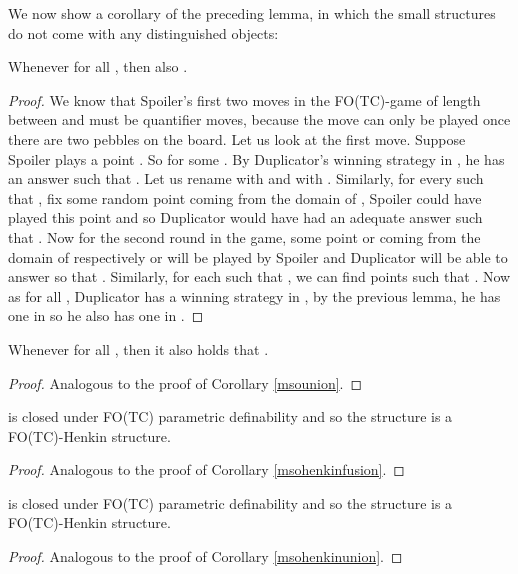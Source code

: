 \documentclass{LMCS}
\newcommand{\fotc}{\textsf{FO(TC)}\xspace}
\begin{document}
\noindent We now show a corollary of the preceding lemma, in which the
small structures do not come with any distinguished objects:
\begin{cor}
Whenever  for all ,
then also .\label{fotcfusion}
\end{cor}

\begin{proof}
We know that Spoiler's first two moves in
the \fotc-game of length  between  and
 must be quantifier
moves, because the  move can only be played once there are two
pebbles on the board. Let us look at the first move. Suppose
Spoiler plays a point . So  for some . By
Duplicator's winning strategy in , he
has an answer  such that . Let us rename  with  and
 with . Similarly, for every  such that , fix some random point  coming from the
domain of , Spoiler could have played this point and so
Duplicator would have had an adequate answer  such that
. Now for the
second round in the game, some point  or 
coming from the domain of respectively  or  will
be played by Spoiler and Duplicator will be able to answer so that
. Similarly, for each  such that
, we can find points such that . Now as for all , Duplicator has a winning strategy in
,
by the previous lemma, he has one in
 so
he also has one in .
\end{proof}

\begin{cor}
Whenever  for all ,
then it also holds that .\label{fotcunion}
\end{cor}

\begin{proof}
Analogous to the proof of Corollary \ref{msounion}.
\end{proof}


\begin{cor}
 is closed
under \fotc parametric definability and so the structure  is a \fotc-Henkin
structure.\label{fotchenkinfusion}
\end{cor}

\begin{proof}
Analogous to the proof of Corollary \ref{msohenkinfusion}.
\end{proof}

\begin{cor}
 is closed
under \fotc parametric definability and so the structure  is a \fotc-Henkin
structure.\label{fotchenkinunion}
\end{cor}
\begin{proof}
Analogous to the proof of Corollary \ref{msohenkinunion}.
\end{proof}
\end{document}
